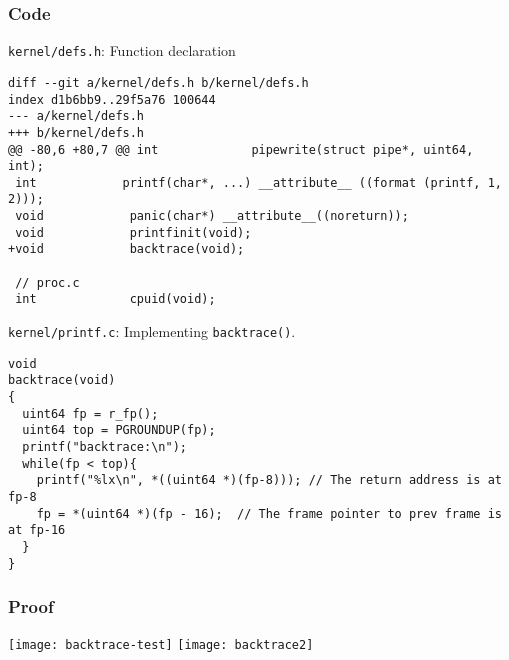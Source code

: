 \documentclass{article}
\begin{document}
\subsubsection*{Code}
\texttt{kernel/defs.h}: Function declaration
\begin{verbatim}
diff --git a/kernel/defs.h b/kernel/defs.h
index d1b6bb9..29f5a76 100644
--- a/kernel/defs.h
+++ b/kernel/defs.h
@@ -80,6 +80,7 @@ int             pipewrite(struct pipe*, uint64, int);
 int            printf(char*, ...) __attribute__ ((format (printf, 1, 2)));
 void            panic(char*) __attribute__((noreturn));
 void            printfinit(void);
+void            backtrace(void);
 
 // proc.c
 int             cpuid(void);
\end{verbatim}

\texttt{kernel/printf.c}: Implementing \texttt{backtrace()}.
\begin{verbatim}
void
backtrace(void)
{
  uint64 fp = r_fp();
  uint64 top = PGROUNDUP(fp);
  printf("backtrace:\n");
  while(fp < top){
    printf("%lx\n", *((uint64 *)(fp-8))); // The return address is at fp-8
    fp = *(uint64 *)(fp - 16);	// The frame pointer to prev frame is at fp-16
  }
}
\end{verbatim}

\subsubsection*{Proof}
\texttt{[image: backtrace-test]}
\texttt{[image: backtrace2]}
\end{document}

